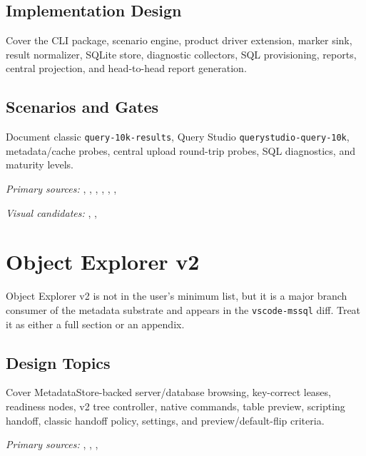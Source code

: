 \documentclass[11pt]{article}
\newcommand{\code}[1]{\texttt{#1}}
\begin{document}
\subsection{Implementation Design}

Cover the CLI package, scenario engine, product driver extension, marker sink, result normalizer, SQLite store, diagnostic collectors, SQL provisioning, reports, central projection, and head-to-head report generation.

\subsection{Scenarios and Gates}

Document classic \code{query-10k-results}, Query Studio \code{querystudio-query-10k}, metadata/cache probes, central upload round-trip probes, SQL diagnostics, and maturity levels.

\noindent\textit{Primary sources:} , , , , , , 

\noindent\textit{Visual candidates:} , , 

\section{Object Explorer v2}

Object Explorer v2 is not in the user's minimum list, but it is a major branch consumer of the metadata substrate and appears in the \code{vscode-mssql} diff.  Treat it as either a full section or an appendix.

\subsection{Design Topics}

Cover MetadataStore-backed server/database browsing, key-correct leases, readiness nodes, v2 tree controller, native commands, table preview, scripting handoff, classic handoff policy, settings, and preview/default-flip criteria.

\noindent\textit{Primary sources:} , , , 
\end{document}
